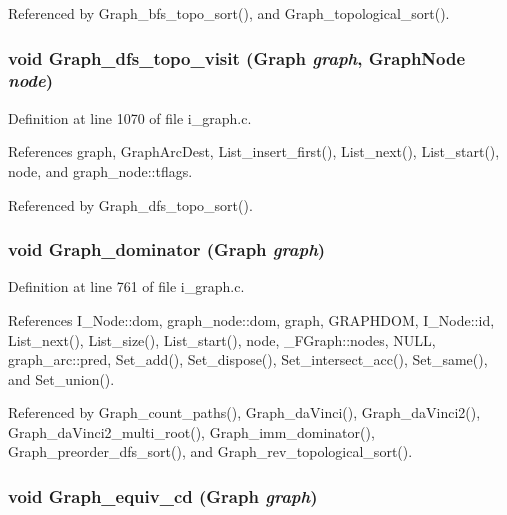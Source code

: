 Referenced by Graph\_\-bfs\_\-topo\_\-sort(), and Graph\_\-topological\_\-sort().
\subsubsection{\setlength{\rightskip}{0pt plus 5cm}void Graph\_\-dfs\_\-topo\_\-visit (\bf{Graph} {\em graph}, \bf{Graph\-Node} {\em node})}\label{i__graph_8c_7b955d60e8dedebabe28f75191ecaaec}




Definition at line 1070 of file i\_\-graph.c.

References graph, Graph\-Arc\-Dest, List\_\-insert\_\-first(), List\_\-next(), List\_\-start(), node, and graph\_\-node::tflags.

Referenced by Graph\_\-dfs\_\-topo\_\-sort().
\subsubsection{\setlength{\rightskip}{0pt plus 5cm}void Graph\_\-dominator (\bf{Graph} {\em graph})}\label{i__graph_8c_85f44f6412a01ba0b41de6e8ef6d1773}




Definition at line 761 of file i\_\-graph.c.

References I\_\-Node::dom, graph\_\-node::dom, graph, GRAPHDOM, I\_\-Node::id, List\_\-next(), List\_\-size(), List\_\-start(), node, \_\-FGraph::nodes, NULL, graph\_\-arc::pred, Set\_\-add(), Set\_\-dispose(), Set\_\-intersect\_\-acc(), Set\_\-same(), and Set\_\-union().

Referenced by Graph\_\-count\_\-paths(), Graph\_\-da\-Vinci(), Graph\_\-da\-Vinci2(), Graph\_\-da\-Vinci2\_\-multi\_\-root(), Graph\_\-imm\_\-dominator(), Graph\_\-preorder\_\-dfs\_\-sort(), and Graph\_\-rev\_\-topological\_\-sort().
\subsubsection{\setlength{\rightskip}{0pt plus 5cm}void Graph\_\-equiv\_\-cd (\bf{Graph} {\em graph})}\label{i__graph_8c_c40cd2fea6900c05dc6b2177d1a834a3}




